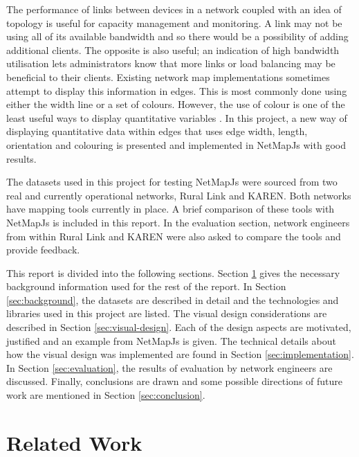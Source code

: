 \documentclass[11pt, a4paper]{report}
\begin{document}
The performance of links between devices in a network coupled with an idea of
topology is useful for capacity management and monitoring. A link may not be
using all of its available bandwidth and so there would be a possibility of
adding additional clients. The opposite is also useful; an indication of high
bandwidth utilisation lets administrators know that more links or load balancing
may be beneficial to their clients. Existing network map implementations
sometimes attempt to display this information in edges. This is most commonly
done using either the width line or a set of colours. However, the use of colour
is one of the least useful ways to display quantitative variables
\cite{Spence_2007}.  In this project, a new way of displaying quantitative data
within edges that uses edge width, length, orientation and colouring is
presented and implemented in NetMapJs with good results.


The datasets used in this project for testing NetMapJs were sourced from two
real and currently operational networks, Rural Link and KAREN. Both networks
have mapping tools currently in place. A brief comparison of these tools with
NetMapJs is included in this report. In the evaluation section, network
engineers from within Rural Link and KAREN were also asked to compare the tools
and provide feedback. 

This report is divided into the following sections. Section
\ref{sec:related-work} gives the necessary background information used for the
rest of the report. In Section \ref{sec:background}, the datasets are described in
detail and the technologies and libraries used in this project are listed. The
visual design considerations are described in Section \ref{sec:visual-design}.
Each of the design aspects are motivated, justified and an example from NetMapJs
is given. The technical details about how the visual design was implemented are
found in Section \ref{sec:implementation}. In Section \ref{sec:evaluation}, the
results of evaluation by network engineers are discussed. Finally, conclusions
are drawn and some possible directions of future work are mentioned in Section
\ref{sec:conclusion}.

\chapter{Related Work}
\label{sec:related-work}
\end{document}
